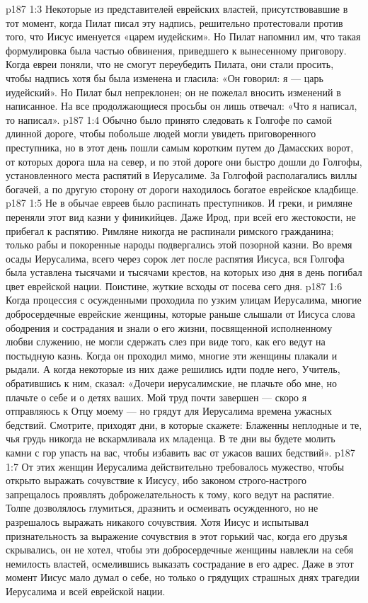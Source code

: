 \vs p187 1:3 Некоторые из представителей еврейских властей, присутствовавшие в тот момент, когда Пилат писал эту надпись, решительно протестовали против того, что Иисус именуется «царем иудейским». Но Пилат напомнил им, что такая формулировка была частью обвинения, приведшего к вынесенному приговору. Когда евреи поняли, что не смогут переубедить Пилата, они стали просить, чтобы надпись хотя бы была изменена и гласила: «Он говорил: я --- царь иудейский». Но Пилат был непреклонен; он не пожелал вносить изменений в написанное. На все продолжающиеся просьбы он лишь отвечал: «Что я написал, то написал».
\vs p187 1:4 Обычно было принято следовать к Голгофе по самой длинной дороге, чтобы побольше людей могли увидеть приговоренного преступника, но в этот день пошли самым коротким путем до Дамасских ворот, от которых дорога шла на север, и по этой дороге они быстро дошли до Голгофы, установленного места распятий в Иерусалиме. За Голгофой располагались виллы богачей, а по другую сторону от дороги находилось богатое еврейское кладбище.
\vs p187 1:5 \pc Не в обычае евреев было распинать преступников. И греки, и римляне переняли этот вид казни у финикийцев. Даже Ирод, при всей его жестокости, не прибегал к распятию. Римляне никогда не распинали римского гражданина; только рабы и покоренные народы подвергались этой позорной казни. Во время осады Иерусалима, всего через сорок лет после распятия Иисуса, вся Голгофа была уставлена тысячами и тысячами крестов, на которых изо дня в день погибал цвет еврейской нации. Поистине, жуткие всходы от посева сего дня.
\vs p187 1:6 \pc Когда процессия с осужденными проходила по узким улицам Иерусалима, многие добросердечные еврейские женщины, которые раньше слышали от Иисуса слова ободрения и сострадания и знали о его жизни, посвященной исполненному любви служению, не могли сдержать слез при виде того, как его ведут на постыдную казнь. Когда он проходил мимо, многие эти женщины плакали и рыдали. А когда некоторые из них даже решились идти подле него, Учитель, обратившись к ним, сказал: «Дочери иерусалимские, не плачьте обо мне, но плачьте о себе и о детях ваших. Мой труд почти завершен --- скоро я отправляюсь к Отцу моему --- но грядут для Иерусалима времена ужасных бедствий. Смотрите, приходят дни, в которые скажете: Блаженны неплодные и те, чья грудь никогда не вскармливала их младенца. В те дни вы будете молить камни с гор упасть на вас, чтобы избавить вас от ужасов ваших бедствий».
\vs p187 1:7 От этих женщин Иерусалима действительно требовалось мужество, чтобы открыто выражать сочувствие к Иисусу, ибо законом строго\hyp{}настрого запрещалось проявлять доброжелательность к тому, кого ведут на распятие. Толпе дозволялось глумиться, дразнить и осмеивать осужденного, но не разрешалось выражать никакого сочувствия. Хотя Иисус и испытывал признательность за выражение сочувствия в этот горький час, когда его друзья скрывались, он не хотел, чтобы эти добросердечные женщины навлекли на себя немилость властей, осмелившись выказать сострадание в его адрес. Даже в этот момент Иисус мало думал о себе, но только о грядущих страшных днях трагедии Иерусалима и всей еврейской нации.
